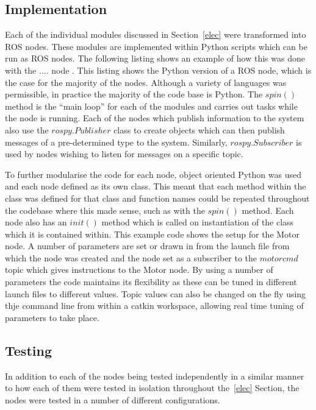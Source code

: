 \subsection{Implementation}\label{soft/ROS/impl}
Each of the individual modules discussed in Section~\ref{elec} were transformed
into ROS nodes. These modules are implemented within Python scripts which can be
run as ROS nodes. The following listing shows an example of how this was done
with the .... node . This listing shows the Python
version of a ROS node, which is the case for the majority of the nodes. Although
a variety of languages was permissible, in practice the majority of the code base
is Python. The $spin()$ method is the ``main loop'' for each of the modules and
carries out tasks while the node is running. Each of the nodes which publish
information to the system also use the $rospy.Publisher$ class to create objects
which can then publish messages of a pre-determined type to the system.
Similarly, $rospy.Subscriber$ is used by nodes wishing to listen for messages on
a specific topic.

To further modularise the code for each node, object oriented Python was used and
each node defined as its own class. This meant that each method within the class
was defined for that class and function names could be repeated throughout the
codebase where this made sense, such as with the $spin()$ method. Each node also
has an $init()$ method which is called on instantiation of the class which it
is contained within. This  example code shows the setup
for the Motor node. A number of parameters are set or drawn in from the launch
file from which the node was created and the node set as a subscriber to the
$motor cmd$ topic which gives instructions to the Motor node. By using a number of parameters the code maintains its flexibility as these can be tuned in different launch files to different values. Topic values can also be changed on the fly using thje command line from within a catkin workspace, allowing real time tuning of parameters to take place.


\subsection{Testing}\label{soft/ROS/test}
In addition to each of the nodes being tested independently in a similar manner to how each of them were tested in isolation throughout the~\ref{elec} Section, the nodes were tested in a number of different configurations.


